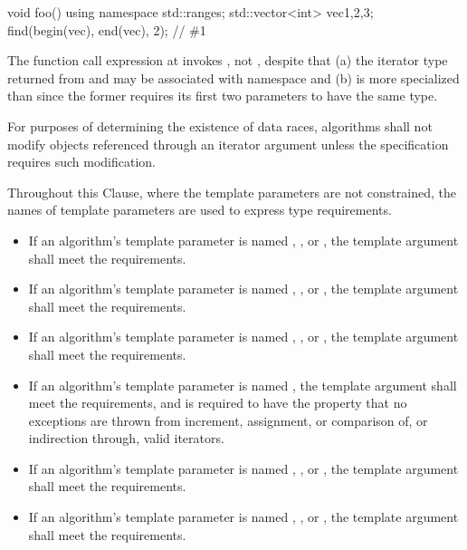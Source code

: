 \begin{example}
\begin{codeblock}
void foo() {
  using namespace std::ranges;
  std::vector<int> vec{1,2,3};
  find(begin(vec), end(vec), 2);        // \#1
}
\end{codeblock}
The function call expression at  invokes ,
not , despite that
(a) the iterator type returned from  and 
may be associated with namespace  and
(b)  is more specialized than
 since the former requires
its first two parameters to have the same type.
\end{example}

\pnum
For purposes of determining the existence of data races,
algorithms shall not modify objects referenced through an iterator argument
unless the specification requires such modification.

\pnum
Throughout this Clause, where the template parameters are not constrained,
the names of template parameters are used to express type requirements.
\begin{itemize}
\item
  If an algorithm's template parameter is named
  ,
  , or
  ,
  the template argument shall meet the
   requirements.
\item
  If an algorithm's template parameter is named
  ,
  , or
  ,
  the template argument shall meet the
   requirements.
\item
  If an algorithm's template parameter is named
  ,
  , or
  ,
  the template argument shall meet the
   requirements.
\item
  If an algorithm's template parameter is named
  ,
  the template argument shall meet the
   requirements, and
  is required to have the property that no exceptions are thrown
  from increment, assignment, or comparison of, or
  indirection through, valid iterators.
\item
  If an algorithm's template parameter is named
  ,
  , or
  ,
  the template argument shall meet the
   requirements.
\item
  If an algorithm's template parameter is named
  ,
  , or
  ,
  the template argument shall meet the
   requirements.
\end{itemize}

